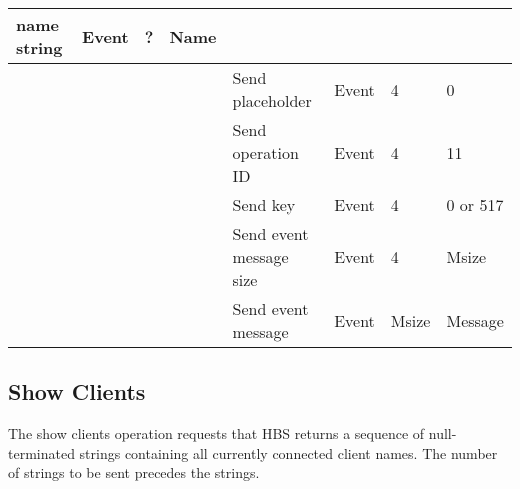 \begin{tabular}{|p{1.2in}|p{.4in}|p{.4in}|p{.5in}|p{1.2in}|p{.4in}|p{.4in}|p{.5in} |}
                                             name string  & Event  &  ?    & Name  \\ \hline
                  &        &       &       & Send placeholder & Event  &   4   &   0    \\  \hline
                  &        &       &       & Send operation 
                                             ID           & Event  &   4   & 11   \\ \hline
                  &        &       &       & Send key     & Event  &   4   &  0 or 517    \\ \hline
                  &        &       &       & Send event message
                                                  size    & Event  &   4   &  Msize \\ \hline
                  &        &       &       & Send event message
                                                          & Event  & Msize & Message  \\ \hline
\end{tabular}
\normalsize
\bigskip



\newpage
\subsection{Show Clients}

The show clients operation requests that HBS returns a sequence of 
null-terminated strings containing all currently connected client names. 
The number of strings to be sent precedes the strings. 


